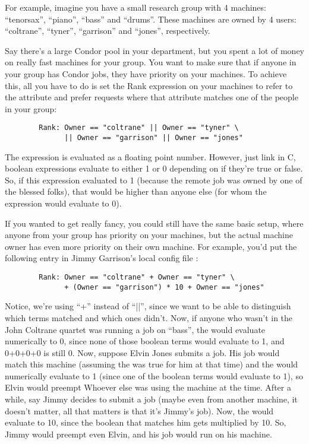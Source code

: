 For example, imagine you have a small research group with 4 machines:
``tenorsax'', ``piano'', ``bass'' and ``drums''.  These machines are
owned by 4 users: ``coltrane'', ``tyner'', ``garrison'' and ``jones'',
respectively.  

Say there's a large Condor pool in your department, but you spent a
lot of money on really fast machines for your group.  You want to make
sure that if anyone in your group has Condor jobs, they have priority
on your machines.  To achieve this, all you have to do is set the Rank
expression on your machines to refer to the  attribute and
prefer requests where that attribute matches one of the people in your
group:

\begin{verbatim}
        Rank: Owner == "coltrane" || Owner == "tyner" \
              || Owner == "garrison" || Owner == "jones"
\end{verbatim}

The  expression is evaluated as a floating point number.
However, just link in C, boolean expressions evaluate to either 1 or 0
depending on if they're true or false.  So, if this expression
evaluated to 1 (because the remote job was owned by one of the blessed
folks), that would be higher than anyone else (for whom the expression
would evaluate to 0).

If you wanted to get really fancy, you could still have the same basic
setup, where anyone from your group has priority on your machines, but
the actual machine owner has even more priority on their own machine.
For example, you'd put the following entry in Jimmy Garrison's local
config file \File{bass.local}:

\begin{verbatim}
        Rank: Owner == "coltrane" + Owner == "tyner" \
              + (Owner == "garrison") * 10 + Owner == "jones"
\end{verbatim}

Notice, we're using ``+'' instead of ``||'', since we want to be able
to distinguish which terms matched and which ones didn't.  Now, if
anyone who wasn't in the John Coltrane quartet was running a job on
``bass'', the \Expr{Rank} would evaluate numerically to 0, since none
of those boolean terms would evaluate to 1, and 0+0+0+0 is still 0.
Now, suppose Elvin Jones submits a job.  His job would match this
machine (assuming the \Expr{START} was true for him at that time) and
the \Expr{Rank} would numerically evaluate to 1 (since one of the
boolean terms would evaluate to 1), so Elvin would preempt Whoever
else was using the machine at the time.  After a while, say Jimmy
decides to submit a job (maybe even from another machine, it doesn't
matter, all that matters is that it's Jimmy's job).  Now, the
\Expr{Rank} would evaluate to 10, since the boolean that matches him
gets multiplied by 10.  So, Jimmy would preempt even Elvin, and his
job would run on his machine.

